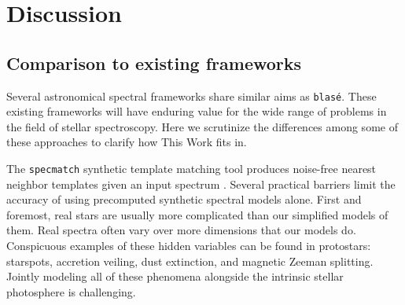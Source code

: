 \documentclass[modern]{aastex631}
\begin{document}


\section{Discussion}\label{secDiscuss}

\subsection{Comparison to existing frameworks}

Several astronomical spectral frameworks share similar aims as \texttt{blas\'e}.  These existing frameworks will have enduring value for the wide range of problems in the field of stellar spectroscopy.  Here we scrutinize the differences among some of these approaches to clarify how This Work fits in.

The \texttt{specmatch} synthetic template matching tool produces noise-free nearest neighbor templates given an input spectrum \citep{2015PhDT........82P}.  Several practical barriers limit the accuracy of using precomputed synthetic spectral models alone. First and foremost, real stars are usually more complicated than our simplified models of them. Real spectra often vary over more dimensions that our models do.  Conspicuous examples of these hidden variables can be found in protostars: starspots, accretion veiling, dust extinction, and magnetic Zeeman splitting. Jointly modeling all of these phenomena alongside the intrinsic stellar photosphere is challenging.
\end{document}
